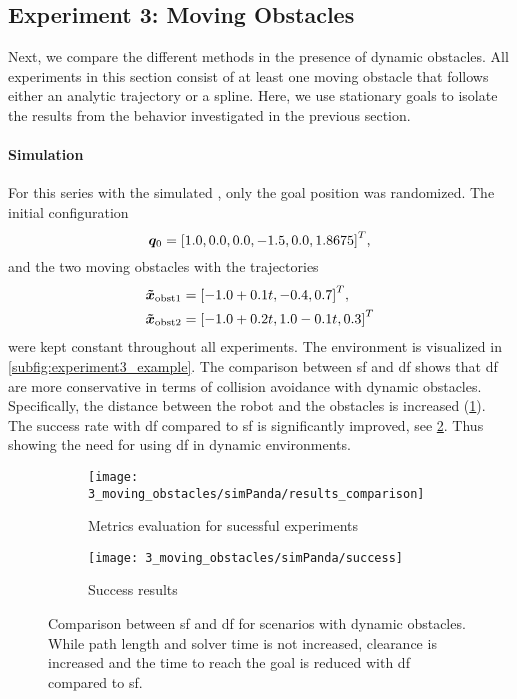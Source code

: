 \subsection{Experiment 3: Moving Obstacles}%
\label{sub:experiment_3_moving_obstacles}
%
Next, we compare the different methods in the presence of dynamic obstacles. All
experiments in this section consist of at least one moving obstacle that follows either an
analytic trajectory or a spline. Here, we use stationary goals to isolate the results from
the behavior investigated in the previous section.

\paragraph{Simulation}
For this series with the simulated \panda{}, 
only the goal position was randomized. The initial configuration 
\[
  \bm{q}_0 = {[1.0, 0.0, 0.0, -1.5, 0.0, 1.8675]}^T, 
\]
and the two moving obstacles with the trajectories
\begin{align*}
  \bm{\tilde{x}}_{\textrm{obst1}} &= {[-1.0 + 0.1t, -0.4, 0.7]}^T,  \\
  \bm{\tilde{x}}_{\textrm{obst2}} &= {[-1.0 + 0.2t, 1.0 - 0.1t, 0.3]}^T
\end{align*}
were kept constant throughout all experiments. The environment is visualized in
\cref{subfig:experiment3_example}. The comparison between \ac{sf} and \ac{df}
shows that \ac{df} are more conservative in terms of collision avoidance with
dynamic obstacles. Specifically, the distance between the robot and the
obstacles is increased (\cref{subfig:experiment3_simPanda_res}).
The success rate with \ac{df} compared to \ac{sf} is significantly improved,
see \cref{subfig:experiment3_simPanda_success}. Thus showing the need for
using \ac{df} in dynamic environments.
%
\begin{figure}[h]
  \centering
  \begin{subfigure}{1.0\linewidth}
    \centering
    \texttt{[image: 3\_moving\_obstacles/simPanda/results\_comparison]}
    \caption{Metrics evaluation for sucessful experiments}%
    \label{subfig:experiment3_simPanda_res}
  \end{subfigure}
  \begin{subfigure}{1.0\linewidth}
    \centering
    \texttt{[image: 3\_moving\_obstacles/simPanda/success]}
    \caption{Success results}%
    \label{subfig:experiment3_simPanda_success}
  \end{subfigure}
  \caption{Comparison between \ac{sf} and \ac{df} for scenarios with dynamic obstacles.
    While path length and solver time is not increased, clearance is increased and
    the time to reach the goal is reduced with \ac{df} compared to \ac{sf}.
  }%
  \label{fig:experiment3_simPanda}
\end{figure}
%

